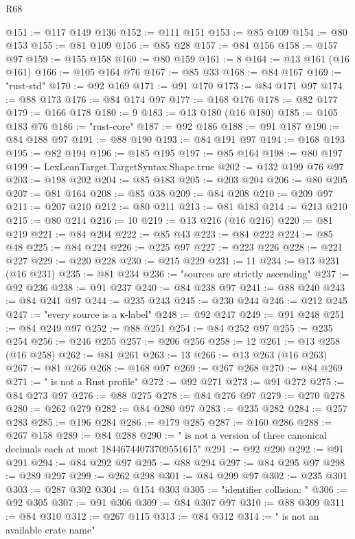 \begin{lexlean}{R68}
\begin{coremodule}
@151 := @117 @149 @136
@152 := @111 @151
@153 := @85 @109
@154 := @80 @153
@155 := @81 @109
@156 := @85 @28
@157 := @84 @156
@158 := @157 @97
@159 := @155 @158
@160 := @80 @159
@161 := 8
@164 := @13 @161 (@16 @161)
@166 := @105 @164 @76
@167 := @85 @33
@168 := @84 @167
@169 := "rust-std"
@170 := @92 @169
@171 := @91 @170
@173 := @84 @171 @97
@174 := @88 @173
@176 := @84 @174 @97
@177 := @168 @176
@178 := @82 @177
@179 := @166 @178
@180 := 9
@183 := @13 @180 (@16 @180)
@185 := @105 @183 @76
@186 := "rust-core"
@187 := @92 @186
@188 := @91 @187
@190 := @84 @188 @97
@191 := @88 @190
@193 := @84 @191 @97
@194 := @168 @193
@195 := @82 @194
@196 := @185 @195
@197 := @85 @164
@198 := @80 @197
@199 := LexLeanTarget.TargetSyntax.Shape.true
@202 := @132 @199 @76 @97
@203 := @198 @202
@204 := @85 @183
@205 := @203 @204
@206 := @80 @205
@207 := @81 @164
@208 := @85 @38
@209 := @84 @208
@210 := @209 @97
@211 := @207 @210
@212 := @80 @211
@213 := @81 @183
@214 := @213 @210
@215 := @80 @214
@216 := 10
@219 := @13 @216 (@16 @216)
@220 := @81 @219
@221 := @84 @204
@222 := @85 @43
@223 := @84 @222
@224 := @85 @48
@225 := @84 @224
@226 := @225 @97
@227 := @223 @226
@228 := @221 @227
@229 := @220 @228
@230 := @215 @229
@231 := 11
@234 := @13 @231 (@16 @231)
@235 := @81 @234
@236 := "sources are strictly ascending"
@237 := @92 @236
@238 := @91 @237
@240 := @84 @238 @97
@241 := @88 @240
@243 := @84 @241 @97
@244 := @235 @243
@245 := @230 @244
@246 := @212 @245
@247 := "every source is a κ-label"
@248 := @92 @247
@249 := @91 @248
@251 := @84 @249 @97
@252 := @88 @251
@254 := @84 @252 @97
@255 := @235 @254
@256 := @246 @255
@257 := @206 @256
@258 := 12
@261 := @13 @258 (@16 @258)
@262 := @81 @261
@263 := 13
@266 := @13 @263 (@16 @263)
@267 := @81 @266
@268 := @168 @97
@269 := @267 @268
@270 := @84 @269
@271 := " is not a Rust profile"
@272 := @92 @271
@273 := @91 @272
@275 := @84 @273 @97
@276 := @88 @275
@278 := @84 @276 @97
@279 := @270 @278
@280 := @262 @279
@282 := @84 @280 @97
@283 := @235 @282
@284 := @257 @283
@285 := @196 @284
@286 := @179 @285
@287 := @160 @286
@288 := @267 @158
@289 := @84 @288
@290 := " is not a version of three canonical decimals each at most 18446744073709551615"
@291 := @92 @290
@292 := @91 @291
@294 := @84 @292 @97
@295 := @88 @294
@297 := @84 @295 @97
@298 := @289 @297
@299 := @262 @298
@301 := @84 @299 @97
@302 := @235 @301
@303 := @287 @302
@304 := @154 @303
@305 := "identifier collision: "
@306 := @92 @305
@307 := @91 @306
@309 := @84 @307 @97
@310 := @88 @309
@311 := @84 @310
@312 := @267 @115
@313 := @84 @312
@314 := " is not an available crate name"

\end{coremodule}
\end{lexlean}

